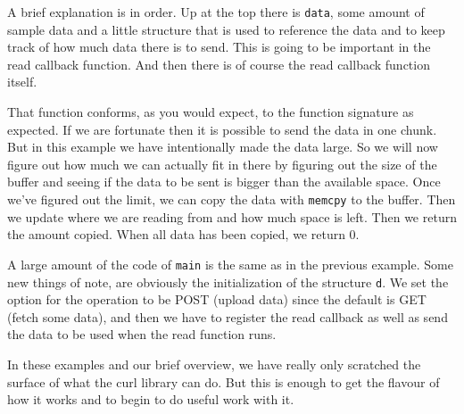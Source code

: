 A brief explanation is in order. Up at the top there is \texttt{data}, some amount of sample data and a little structure that is used to reference the data and to keep track of how much data there is to send. This is going to be important in the read callback function. And then there is of course the read callback function itself.

That function conforms, as you would expect, to the function signature as expected. If we are fortunate then it is possible to send the data in one chunk. But in this example we have intentionally made the data large. So we will now figure out how much we can actually fit in there by figuring out the size of the buffer and seeing if the data to be sent is bigger than the available space. Once we've figured out the limit, we can copy the data with \texttt{memcpy} to the buffer. Then we update where we are reading from and how much space is left. Then we return the amount copied. When all data has been copied, we return 0.

A large amount of the code of \texttt{main} is the same as in the previous example. Some new things of note, are obviously the initialization of the structure \texttt{d}. We set the option for the operation to be POST (upload data) since the default is GET (fetch some data), and then we have to register the read callback as well as send the data to be used when the read function runs.

In these examples and our brief overview, we have really only scratched the surface of what the curl library can do. But this is enough to get the flavour of how it works and to begin to do useful work with it.



